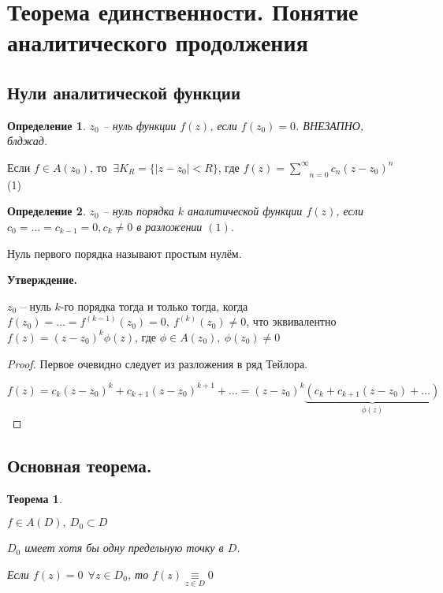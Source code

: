 \documentclass[draft]{report}
\newcommand{\forcenewline}{$\phantom{\mbox{newline}}$\newline}
\newcommand{\msum}[2]{\underset{#1}{\overset{#2}{\sum}}}
\newcommand{\ssum}{\msum{n=0}{\infty}}
\renewcommand{\f}{\phi}
\newcommand{\E}{\ \exists}
\newcommand{\F}{\ \forall}
\newcommand{\opr}[1]{\begin{opred}#1\end{opred}}
\newtheorem*{theor}{Теорема}
\newtheorem*{opred}{Определение}
\theoremstyle{remark}
\begin{document}
\section{Теорема единственности. Понятие аналитического продолжения}

\subsection{Нули аналитической функции}

\opr{$z_0$ -- нуль функции $f(z)$, если $f(z_0)=0$. ВНЕЗАПНО, блджад.}

Если $f\in A(z_0)$, то $\E K_R=\{|z-z_0|<R\}$, где $f(z)=\ssum c_n(z-z_0)^n$ (1)

\opr{$z_0$ -- нуль порядка $k$ аналитической функции $f(z)$, если $c_0=\ldots=c_{k-1}=0,c_k\neq0$ в разложении $(1)$.}

Нуль первого порядка называют простым нулём.

{\bfseries Утверждение.}

$z_0$ -- нуль $k$-го порядка тогда и только тогда, когда $f(z_0)=\ldots=f^{(k-1)}(z_0)=0,\ f^{(k)}(z_0)\neq 0$, что эквивалентно $f(z)=(z-z_0)^k\f(z)$, где $\f\in A(z_0),\ \f(z_0)\neq0$
\begin{proof}
Первое очевидно следует из разложения в ряд Тейлора.

$f(z)=c_k(z-z_0)^k+c_{k+1}(z-z_0)^{k+1}+\ldots=(z-z_0)^k\underset{\f(z)}{\underbrace{(c_k+c_{k+1}(z-z_0)+\ldots)}}$
\end{proof}

\subsection{Основная теорема.}

\begin{theor}
\forcenewline

$f\in A(D),\ D_0\subset D$

$D_0$ имеет хотя бы одну предельную точку в $D$.

Если $f(z)=0\ \F z\in D_0$, то $f(z)\underset{z\in D}{\equiv}0$
\end{theor}
\end{document}
